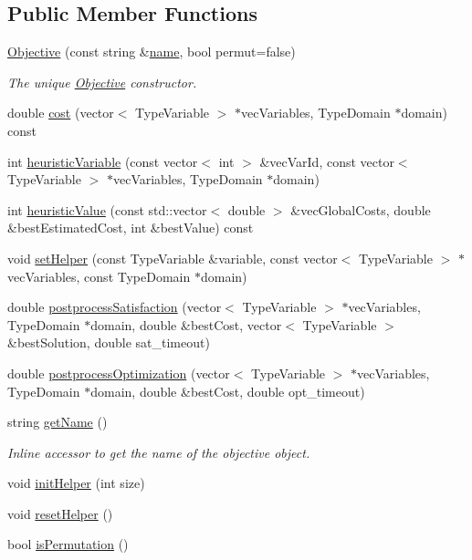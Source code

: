 \subsection*{Public Member Functions}
\begin{DoxyCompactItemize}
\item 
\hyperlink{classghost_1_1Objective_ae8f0c0e859244a5acf8e6f9a609b8e12}{Objective} (const string \&\hyperlink{classghost_1_1Objective_ae9533a52b3600c826df6e20c65db1e7a}{name}, bool permut=false)
\begin{DoxyCompactList}\small\item\em The unique \hyperlink{classghost_1_1Objective}{Objective} constructor. \end{DoxyCompactList}\item 
double \hyperlink{classghost_1_1Objective_a8ac8effdac4a09063fd680ed60b6a06f}{cost} (vector$<$ Type\+Variable $>$ $\ast$vec\+Variables, Type\+Domain $\ast$domain) const 
\item 
int \hyperlink{classghost_1_1Objective_af68c07a226162ea7f9ee01a0b00d3ae4}{heuristic\+Variable} (const vector$<$ int $>$ \&vec\+Var\+Id, const vector$<$ Type\+Variable $>$ $\ast$vec\+Variables, Type\+Domain $\ast$domain)
\item 
int \hyperlink{classghost_1_1Objective_ac9d6c8e05cca99cd797d302b3755b6b5}{heuristic\+Value} (const std\+::vector$<$ double $>$ \&vec\+Global\+Costs, double \&best\+Estimated\+Cost, int \&best\+Value) const 
\item 
void \hyperlink{classghost_1_1Objective_ab589c264cf391bab9005562f66a39797}{set\+Helper} (const Type\+Variable \&variable, const vector$<$ Type\+Variable $>$ $\ast$vec\+Variables, const Type\+Domain $\ast$domain)
\item 
double \hyperlink{classghost_1_1Objective_aa79835aa61f6680e78912ecaee6f7fbc}{postprocess\+Satisfaction} (vector$<$ Type\+Variable $>$ $\ast$vec\+Variables, Type\+Domain $\ast$domain, double \&best\+Cost, vector$<$ Type\+Variable $>$ \&best\+Solution, double sat\+\_\+timeout)
\item 
double \hyperlink{classghost_1_1Objective_adbaff57012dd756d87dc5151d9718296}{postprocess\+Optimization} (vector$<$ Type\+Variable $>$ $\ast$vec\+Variables, Type\+Domain $\ast$domain, double \&best\+Cost, double opt\+\_\+timeout)
\item 
string \hyperlink{classghost_1_1Objective_adfe2130d5a472771544a4033e457c4bb}{get\+Name} ()
\begin{DoxyCompactList}\small\item\em Inline accessor to get the name of the objective object. \end{DoxyCompactList}\item 
void \hyperlink{classghost_1_1Objective_ad4432d190d227f7e67bd505f0b4b80e9}{init\+Helper} (int size)
\item 
void \hyperlink{classghost_1_1Objective_a76ca30dd5fc977963058f0c3abfe100a}{reset\+Helper} ()
\item 
bool \hyperlink{classghost_1_1Objective_a558991ad856cff48262e2848c6ab5796}{is\+Permutation} ()
\end{DoxyCompactItemize}
